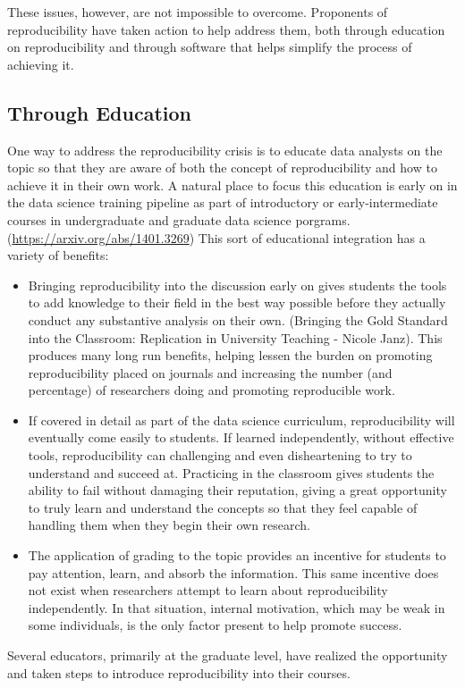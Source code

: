 \documentclass[12pt,twoside]{reedthesis}
\begin{document}
These issues, however, are not impossible to overcome. Proponents of
reproducibility have taken action to help address them, both through
education on reproducibility and through software that helps simplify
the process of achieving it.

\subsection{Through Education}\label{through-education}

One way to address the reproducibility crisis is to educate data
analysts on the topic so that they are aware of both the concept of
reproducibility and how to achieve it in their own work. A natural place
to focus this education is early on in the data science training
pipeline as part of introductory or early-intermediate courses in
undergraduate and graduate data science porgrams.
(\url{https://arxiv.org/abs/1401.3269}) This sort of educational
integration has a variety of benefits:
\begin{itemize}
\item
  Bringing reproducibility into the discussion early on gives students
  the tools to add knowledge to their field in the best way possible
  before they actually conduct any substantive analysis on their own.
  (Bringing the Gold Standard into the Classroom: Replication in
  University Teaching - Nicole Janz). This produces many long run
  benefits, helping lessen the burden on promoting reproducibility
  placed on journals and increasing the number (and percentage) of
  researchers doing and promoting reproducible work.
\item
  If covered in detail as part of the data science curriculum,
  reproducibility will eventually come easily to students. If learned
  independently, without effective tools, reproducibility can
  challenging and even disheartening to try to understand and succeed
  at. Practicing in the classroom gives students the ability to fail
  without damaging their reputation, giving a great opportunity to truly
  learn and understand the concepts so that they feel capable of
  handling them when they begin their own research.
\item
  The application of grading to the topic provides an incentive for
  students to pay attention, learn, and absorb the information. This
  same incentive does not exist when researchers attempt to learn about
  reproducibility independently. In that situation, internal motivation,
  which may be weak in some individuals, is the only factor present to
  help promote success.
\end{itemize}
Several educators, primarily at the graduate level, have realized the
opportunity and taken steps to introduce reproducibility into their
courses.
\end{document}
